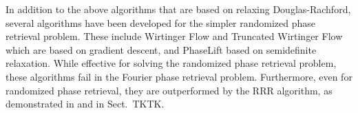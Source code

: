 \documentclass[12pt]{article}
\theoremstyle{definition}
\theoremstyle{remark}
\theoremstyle{definition}
\theoremstyle{problem}
\theoremstyle{definition}
\newcommand{\MM}{\mathcal{M}}
\newcommand{\TODO}[1]{{\color{red}{[#1]}}}
\begin{document}
In addition to the above algorithms that are based on relaxing Douglas-Rachford, several algorithms have been developed for the simpler randomized phase retrieval problem. These include Wirtinger Flow and Truncated Wirtinger Flow which are based on gradient descent, and PhaseLift based on semidefinite relaxation. While effective for solving the randomized phase retrieval problem, these algorithms fail in the Fourier phase retrieval problem. Furthermore, even for randomized phase retrieval, they are outperformed by the RRR algorithm, as demonstrated in \TODO{benchmarks} and in Sect.~TKTK. 
%
%
\end{document}
